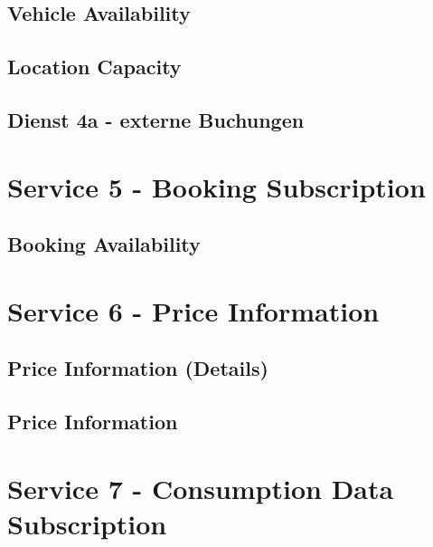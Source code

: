 \subsection*{Vehicle Availability}



\subsection*{Location Capacity}



\subsection*{Dienst 4a - externe Buchungen}
\label{sec:Datenmodell:Dienst4a}



\section{Service 5 - Booking Subscription}
\label{sec:Datenmodell:Dienst5}

\subsection*{Booking Availability}



\section{Service 6 - Price Information}
\label{sec:Datenmodell:Dienst6}

\subsection*{Price Information (Details)}



\subsection*{Price Information}



\section{Service 7 - Consumption Data Subscription}
\label{sec:Datenmodell:Dienst7}

